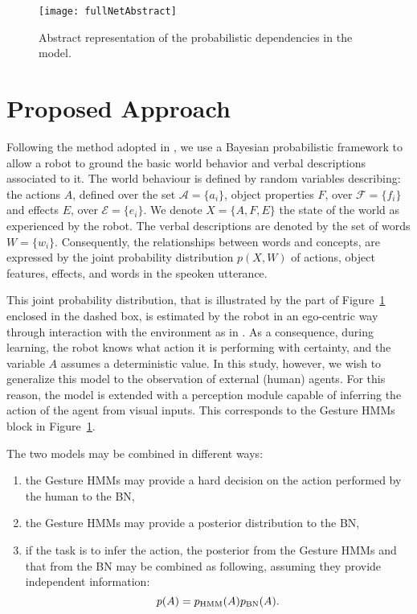 
\begin{figure}
  \centering
  \texttt{[image: fullNetAbstract]}
  \caption{Abstract representation of the probabilistic dependencies in the model.}
  \label{fig:model}
\end{figure}

\section{Proposed Approach}
Following the method adopted in \cite{salvi:2012:smcb}, we use a Bayesian probabilistic framework to allow a robot to ground the basic world behavior and verbal descriptions associated to it.
The world behaviour is defined by random variables describing: the actions $A$, defined over the set $\mathcal{A}=\{a_i\}$, object properties $F$, over $\mathcal{F}=\{f_i\}$ and effects $E$, over $\mathcal{E}=\{e_i\}$.
We denote $X=\{A, F, E\}$ the state of the world as experienced by the robot.
The verbal descriptions are denoted by the set of words $W=\{w_i\}$.
Consequently, the relationships between words and concepts, are expressed by the joint probability distribution $p(X,W)$ of actions, object features, effects, and words in the speoken utterance.

This joint probability distribution, that is illustrated by the part of Figure~\ref{fig:model} enclosed in the dashed box, is estimated by the robot in an ego-centric way through interaction with the environment as in \cite{salvi:2012:smcb}.
As a consequence, during learning, the robot knows what action it is performing with certainty, and the variable $A$ assumes a deterministic value.
In this study, however, we wish to generalize this model to the observation of external (human) agents.
For this reason, the model is extended with a perception module capable of inferring the action of the agent from visual inputs.
This corresponds to the Gesture \acp{HMM} block in Figure~\ref{fig:model}.

The two models may be combined in different ways:
\begin{enumerate}
\item the Gesture \acp{HMM} may provide a hard decision on the action performed by the human to the \ac{BN},
\item the Gesture \acp{HMM} may provide a posterior distribution to the \ac{BN},
\item if the task is to infer the action, the posterior from the Gesture \acp{HMM} and that from the \ac{BN} may be combined as following, assuming they provide independent information:
  $$ p(A) = p_{\mbox{\scriptsize HMM}}(A)p_{\mbox{\scriptsize BN}}(A).$$
\end{enumerate}

